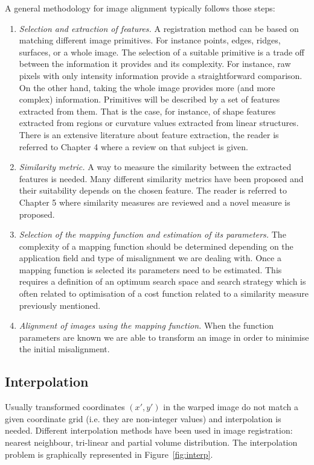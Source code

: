 A general methodology for image alignment typically follows those
steps:

\begin{enumerate}
\item \emph{Selection and extraction of features.} A registration method can
be based on matching different image primitives. For instance
points, edges, ridges, surfaces, or a whole image. The selection
of a suitable primitive is a trade off between the information it
provides and its complexity. For instance, raw pixels with only
intensity information provide a straightforward comparison. On the
other hand, taking the whole image provides more (and more
complex) information. Primitives will be described by a set of
features extracted from them. That is the case, for instance, of
shape features extracted from regions or curvature values
extracted from linear structures. There is an extensive literature
about feature extraction, the reader is referred to Chapter 4
where a review on that subject is given.

\item \emph{Similarity metric.} A way to measure the similarity between
the extracted features is needed. Many different similarity
metrics have been proposed and their suitability depends on the
chosen feature. The reader is referred to Chapter 5 where
similarity measures are reviewed and a novel measure is proposed.

\item \emph{Selection of the mapping function and estimation of
its parameters.} The complexity of a mapping function should be
determined depending on the application field and type of
misalignment we are dealing with. Once a mapping function is
selected its parameters need to be estimated. This requires a
definition of an optimum search space and search strategy which is
often related to optimisation of a cost function related to a
similarity measure previously mentioned.

\item \emph{Alignment of images using the mapping function.} When the
function parameters are known we are able to transform an image in
order to minimise the initial misalignment.
\end{enumerate}


\subsection{Interpolation}
Usually transformed coordinates $(x',y')$ in the warped image do
not match a given coordinate grid (i.e. they are non-integer
values) and interpolation is needed. Different interpolation
methods have been used in image registration: nearest neighbour,
tri-linear and partial volume distribution. The interpolation
problem is graphically represented in Figure~\ref{fig:interp}.

